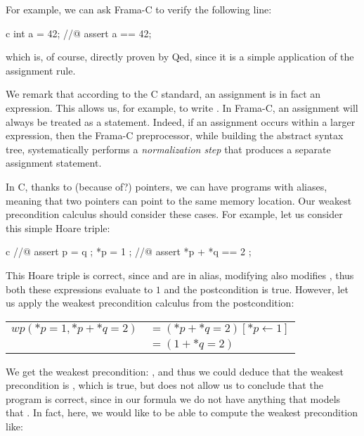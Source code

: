 For example, we can ask Frama-C to verify the following line:
\begin{CodeBlock}{c}
int a = 42;
//@ assert a == 42;
\end{CodeBlock}
which is, of course, directly proven by Qed, since it is a simple
application of the assignment rule.



\begin{Information}
  We remark that according to the C standard, an assignment is in fact an
  expression. This allows us, for example, to write
  .
  In Frama-C, an assignment will always be treated as a statement. Indeed,
  if an assignment occurs within a larger expression, then the Frama-C
  preprocessor, while building the abstract syntax tree, systematically
  performs a \emph{normalization step} that produces a separate assignment
  statement.
\end{Information}






In C, thanks to (because of?) pointers, we can have programs with aliases,
meaning that two pointers can point to the same memory location. Our weakest
precondition calculus should consider these cases. For example, let us consider
this simple Hoare triple:


\begin{CodeBlock}{c}
//@ assert p = q ;
*p = 1 ;
//@ assert *p + *q == 2 ;
\end{CodeBlock}



This Hoare triple is correct, since  and  are in
alias, modifying  also modifies , thus both these
expressions evaluate to $1$ and the postcondition is true. However, let us apply
the weakest precondition calculus from the postcondition:



\begin{tabular}{ll}
$wp(*p = 1, *p + *q = 2)$ & $= (*p + *q = 2)[*p \leftarrow 1]$\\
                          & $= (1 + *q = 2)$
\end{tabular}



We get the weakest precondition: , and thus we could
deduce that the weakest precondition is , which is true, but
does not allow us to conclude that the program is correct, since in our formula
we do not have anything that models that . In
fact, here, we would like to be able to compute the weakest precondition like:




